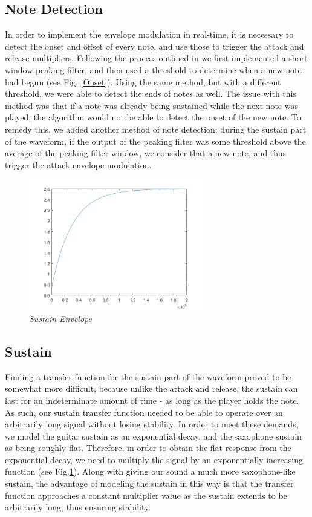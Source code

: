 \documentclass[twoside,a4paper]{article}
\begin{document}
\subsection{Note Detection}
In order to implement the envelope modulation in real-time, it is necessary to detect
the onset and offset of every note, and use those to trigger the attack
and release multipliers. Following the process outlined in \cite{NoteOnset}
we first implemented a short window peaking filter, and then used a threshold
to determine when a new note had begun (see Fig. \ref{Onset}). Using the same method,
but with a different threshold, we were able to detect the ends of notes as well.
The issue with this method was that if a note was already being sustained while
the next note was played, the algorithm would not be able to detect the onset of
the new note. To remedy this, we added another method of note detection: during
the sustain part of the waveform, if the output of the peaking filter was some
threshold above the average of the peaking filter window, we consider that a new
note, and thus trigger the attack envelope modulation.

\begin{figure}[ht]
  \includegraphics[width=3in]{Pictures/Sustain_Env.png}
  \centering
  \caption{\label{Sustain} {\it Sustain Envelope}}
  \centering
  \end{figure}

\subsection{Sustain}
Finding a transfer function for the sustain part of the waveform proved
to be somewhat more difficult, because unlike the attack and release,
the sustain can last for an indeterminate amount of time - as long as
the player holds the note. As such, our sustain transfer function needed
to be able to operate over an arbitrarily long signal without losing
stability. In order to meet these demands, we model the guitar sustain
as an exponential decay, and the saxophone sustain as being roughly flat.
Therefore, in order to obtain the flat response from the exponential decay,
we need to multiply the signal by an exponentially increasing function (see Fig.\ref{Sustain}).
Along with giving our sound a much more saxophone-like sustain, the advantage of
modeling the sustain in this way is that the transfer function approaches a
constant multiplier value as the sustain extends to be
arbitrarily long, thus ensuring stability.
\end{document}
